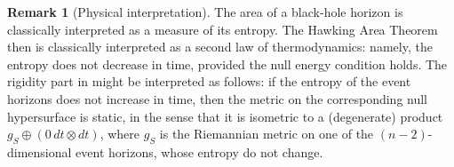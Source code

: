 \documentclass[12pt,a4paper]{amsart}
\theoremstyle{plain}
\theoremstyle{definition}
\newtheorem{remark}[lemma]{Remark}
\numberwithin{equation}{section}
\begin{document}
\begin{remark}[Physical interpretation]\label{rem:InterpRigidity}
The area of a black-hole horizon is classically interpreted as a measure of its entropy. The Hawking Area Theorem then is classically interpreted as a second law of thermodynamics: namely, the entropy does not decrease in time, provided the null energy condition holds. The rigidity part in  might be interpreted as follows: if the entropy of the event horizons does not increase in time, then the metric on the corresponding null hypersurface is static, in the sense that it is isometric to a (degenerate) product $g_S\oplus (0\, dt\otimes dt)$, where $g_S$ is the Riemannian metric on one of the $(n-2)$-dimensional event horizons, whose entropy do not change.
\end{remark}
\end{document}
